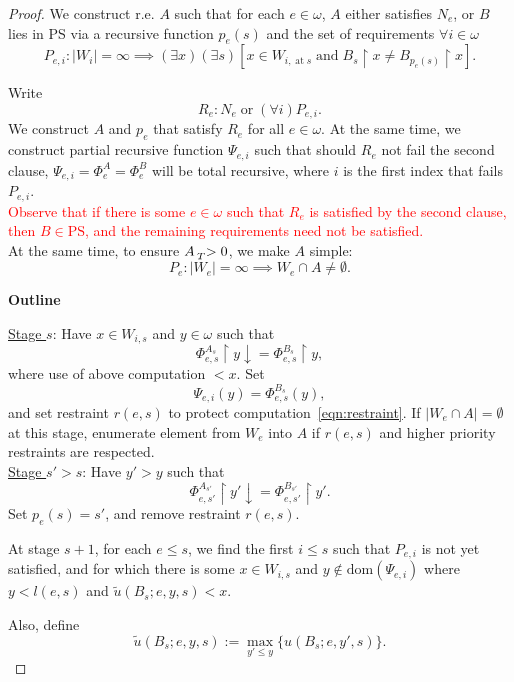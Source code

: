 \documentclass{article}
\newcommand{\COMMENT}[1]{\textcolor{red}{#1}}
\begin{document}
  \begin{proof}
    We construct r.e. $A$ such that for each $e\in\omega$, $A$
    either satisfies $N_e$, or $B$ lies in PS via a recursive function
    $p_e(s)$ and the set of requirements $\forall i\in\omega$
    \[P_{e,i}: |W_i|=\infty \implies (\exists x)(\exists s) [x\in
    W_{i,\; \text{at}\; s}\; \text{and}\; B_s\restriction x \neq B_{p_e(s)}
    \restriction x].\]

    Write
    \[R_e: N_e\; \text{or}\; (\forall i)P_{e,i}.\]
    We construct $A$ and $p_e$ that satisfy $R_e$ for all $e\in\omega$. At
    the same time, we construct partial recursive function $\Psi_{e,i}$
    such that should $R_e$ not fail the second clause,
    $\Psi_{e,i}=\Phi_e^A=\Phi_e^B$ will be total recursive, where $i$ is
    the first index that fails $P_{e,i}$.\\

    \COMMENT{Observe that if there is some $e\in\omega$ such that $R_e$ is
    satisfied by the second clause, then $B\in\text{PS}$, and the remaining
    requirements need not be satisfied.}\\

    At the same time, to ensure $A\prescript{}{T}{>}\;0$, we make $A$
    simple:
    \[P_e: |W_e|=\infty \implies W_e\cap A\neq\emptyset.\]

    \textbf{Outline}
    \begin{tcolorbox}
      \underline{Stage $s$}: Have $x\in W_{i,s}$ and $y\in\omega$ such that
      \begin{equation}
        \tag{$*$}
        \Phi_{e,s}^{A_s}\restriction y \downarrow=
        \Phi_{e,s}^{B_s}\restriction y,
        \label{eqn:restraint}
      \end{equation}
      where use of above computation $<x$. Set
      \[\Psi_{e,i}(y)=\Phi_{e,s}^{B_s}(y),\]
      and set restraint $r(e,s)$ to protect
      computation~\eqref{eqn:restraint}. If $|W_e\cap A|=\emptyset$ at this
      stage, enumerate element from $W_e$ into $A$ if $r(e,s)$ and higher
      priority restraints are respected.\\

      \underline{Stage $s'>s$}: Have $y'>y$ such that
      \begin{equation}
        \Phi_{e,s'}^{A_{s'}}\restriction y' \downarrow=
        \Phi_{e,s'}^{B_{s'}}\restriction y'.
      \end{equation}
      Set $p_e(s)=s'$, and remove restraint $r(e,s)$.
    \end{tcolorbox}

    \par
    At stage $s+1$, for each $e\leq s$, we find the first $i\leq s$ such
    that $P_{e,i}$ is not yet satisfied, and for which there is some $x\in
    W_{i,s}$ and $y\not\in\text{dom}(\Psi_{e,i})$ where $y<l(e,s)$ and
    $\tilde{u}(B_s;e,y,s)<x$.

    Also, define
    \[\tilde{u}(B_s;e,y,s) :=\max_{y'\leq y}\{u(B_s;e,y',s)\}.\]
  \end{proof}
\end{document}
